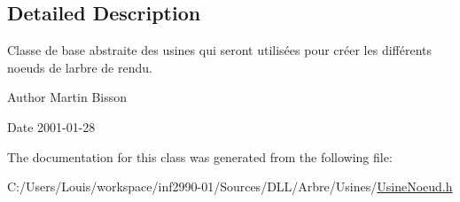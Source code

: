 \subsection{Detailed Description}
Classe de base abstraite des usines qui seront utilisées pour créer les différents noeuds de l\textquotesingle{}arbre de rendu. 

\begin{DoxyAuthor}{Author}
Martin Bisson 
\end{DoxyAuthor}
\begin{DoxyDate}{Date}
2001-\/01-\/28 
\end{DoxyDate}


The documentation for this class was generated from the following file\+:\begin{DoxyCompactItemize}
\item 
C\+:/\+Users/\+Louis/workspace/inf2990-\/01/\+Sources/\+D\+L\+L/\+Arbre/\+Usines/\hyperlink{_usine_noeud_8h}{Usine\+Noeud.\+h}\end{DoxyCompactItemize}
